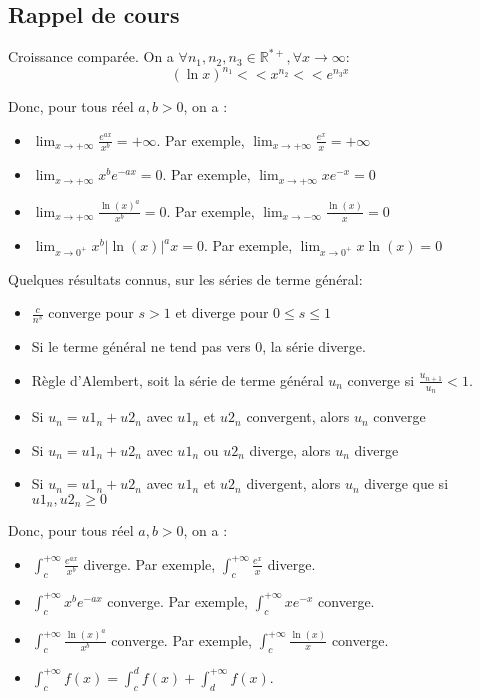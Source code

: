 \documentclass[]{book}
\theoremstyle{definition}
\newcommand{\bb}[1]{\mathbb{#1}}
\newcommand{\R}{\bb{R}}
\begin{document}
\subsection*{Rappel de cours}
Croissance compar\'ee. On a $\forall n_1, n_2, n_3 \in \R^{*+}, \forall x \to \infty$:
$$(\ln x)^{n_1} << x^{n_2} << e^{n_3 x}$$


Donc, pour tous r\'eel $a,b > 0$, on a :
\begin{itemize}
\item $\lim_{x \to +\infty}{\frac{e^{ax}}{x^b}} = +\infty$. Par exemple, $\lim_{x \to +\infty}{\frac{e^x}{x}} = +\infty$  
\item $\lim_{x \to +\infty}{x^{b}e^{-ax}} = 0$. Par exemple, $\lim_{x \to +\infty}{xe^{-x}} = 0$  
\item $\lim_{x \to +\infty}{\frac{\ln(x)^a}{x^b}} = 0$. Par exemple, $\lim_{x \to -\infty}{\frac{\ln(x)}{x}} = 0$  
\item $\lim_{x \to 0^{+}}{x^{b}|\ln(x)|^ax} = 0$. Par exemple, $\lim_{x \to 0^{+}}{x\ln(x)} = 0$  
\end{itemize}

Quelques r\'esultats connus, sur les s\'eries de terme g\'en\'eral:
\begin{itemize}
\item  $\frac{c}{n^s}$ converge pour $s > 1$ et diverge pour $0 \leq s \leq 1$
\item Si le terme g\'en\'eral ne tend pas vers 0, la s\'erie diverge.
\item R\`egle d'Alembert, soit la s\'erie de terme g\'en\'eral $u_n$ converge si $\frac{u_{n+1}}{u_{n}} < 1$.
\item Si $u_n = u1_n + u2_n$ avec $u1_n$ et $u2_n$ convergent, alors $u_n$ converge
\item Si $u_n = u1_n + u2_n$ avec $u1_n$ ou $u2_n$ diverge, alors $u_n$ diverge
\item Si $u_n = u1_n + u2_n$ avec $u1_n$ et $u2_n$ divergent, alors $u_n$ diverge que si $u1_n, u2_n \geq 0$
\end{itemize}



Donc, pour tous r\'eel $a,b > 0$, on a :
\begin{itemize}
\item $\int_{c}^{+\infty}{\frac{e^{ax}}{x^b}}$ diverge. Par exemple, $\int_{c}^{+\infty}{\frac{e^{x}}{x}}$ diverge. 
\item $\int_{c}^{+\infty}{x^{b}e^{-ax}}$ converge. Par exemple, $\int_{c}^{+\infty}{xe^{-x}}$ converge.  
\item $\int_{c}^{+\infty}{\frac{\ln(x)^a}{x^b}}$ converge. Par exemple, $\int_{c}^{+\infty}{\frac{\ln(x)}{x}}$ converge.
\item $\int_{c}^{+\infty}f(x) = \int_{c}^{d}f(x) + \int_{d}^{+\infty}f(x)$.
\end{itemize}
\end{document}
